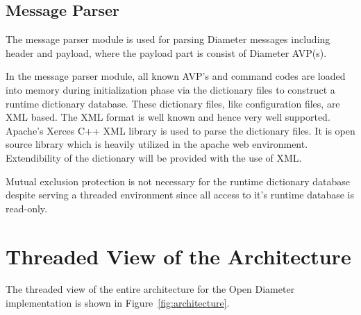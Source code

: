 \documentclass{article}
\begin{document}
\subsection{Message Parser\label{sec:msgparser}}

The message parser module is used for parsing Diameter messages
including header and payload, where the payload part is consist 
of Diameter AVP(s).

In the message parser module, all known AVP's and command codes are
loaded into memory during initialization phase via the dictionary files
to construct a runtime dictionary database.  These dictionary files,
like configuration files, are XML based. The XML format is well known
and hence very well supported.  Apache's Xerces C++ XML library is used
to parse the dictionary files. It is open source library which is
heavily utilized in the apache web environment.  Extendibility of the
dictionary will be provided with the use of XML.

Mutual exclusion protection is not necessary for the runtime dictionary
database despite serving a threaded environment since all access to it's
runtime database is read-only.


\section{Threaded View of the Architecture
\label{sec:architecture}}

The threaded view of the entire architecture for the Open Diameter
implementation is shown in Figure~\ref{fig:architecture}.

\begin{figure}[htbp]
\end{figure}
\end{document}
